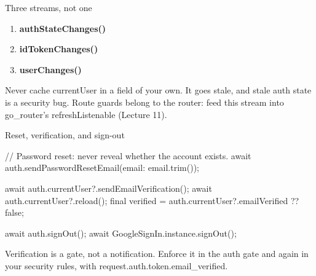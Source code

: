 \documentclass[10pt,aspectratio=169,t]{beamer}
\begin{document}
\begin{frame}[eyebrow=Firebase Auth]{Three streams, not one}
  \vskip 2mm
  \begin{enumerate}
    \item \textbf{authStateChanges()} 
    \item \textbf{idTokenChanges()} 
    \item \textbf{userChanges()} 
  \end{enumerate}
  \begin{takeaway}{Never cache currentUser in a field of your own.}
    It goes stale, and stale auth state is a security bug. Route guards belong to the router: feed this stream into go\_router's refreshListenable (Lecture 11).
  \end{takeaway}
\end{frame}

\begin{frame}[fragile,eyebrow=Firebase Auth]{Reset, verification, and sign-out}
\begin{dart}
// Password reset: never reveal whether the account exists.
await auth.sendPasswordResetEmail(email: email.trim());

await auth.currentUser?.sendEmailVerification();
await auth.currentUser?.reload();
final verified = auth.currentUser?.emailVerified ?? false;

await auth.signOut();
await GoogleSignIn.instance.signOut();
\end{dart}
  \begin{takeaway}{Verification is a gate, not a notification.}
    Enforce it in the auth gate and again in your security rules, with request.auth.token.email\_verified.
  \end{takeaway}
\end{frame}
\end{document}
